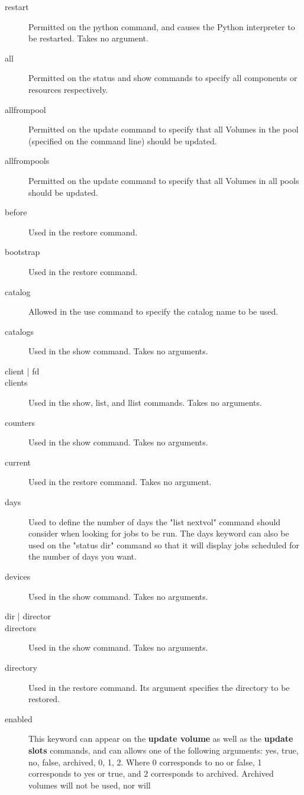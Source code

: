 \begin{description}
\item [restart]
  Permitted on the python command, and causes the Python
  interpreter to be restarted. Takes no argument.
\item [all]
  Permitted on the status and show commands to specify all components or
  resources respectively.
\item [allfrompool]
  Permitted on the update command to specify that all Volumes in the
  pool (specified on the command line) should be updated.
\item [allfrompools]
  Permitted on the update command to specify that all Volumes in all
  pools should be updated.
\item [before]
  Used in the restore command.
\item [bootstrap]
  Used in the restore command.
\item [catalog]
  Allowed in the use command to specify the catalog name
  to be used.
\item [catalogs]
  Used in the show command. Takes no arguments.
\item [client | fd]
\item [clients]
  Used in the show, list, and llist commands. Takes no arguments.
\item [counters]
  Used in the show command. Takes no arguments.
\item [current]
  Used in the restore command. Takes no argument.
\item [days]
  Used to define the number of days the "list nextvol" command
  should consider when looking for jobs to be run.  The days keyword
  can also be used on the "status dir" command so that it will display
  jobs scheduled for the number of days you want.
\item [devices]
  Used in the show command. Takes no arguments.
\item [dir | director]
\item [directors]
  Used in the show command. Takes no arguments.
\item [directory]
  Used in the restore command. Its argument specifies the directory
  to be restored.
\item [enabled]
  This keyword can appear on the {\bf update volume} as well
  as the {\bf update slots} commands, and can
  allows one of the following arguments: yes, true, no, false, archived,
  0, 1, 2.  Where 0 corresponds to no or false, 1 corresponds to yes or true, and
  2 corresponds to archived.  Archived volumes will not be used, nor will

\end{description}

